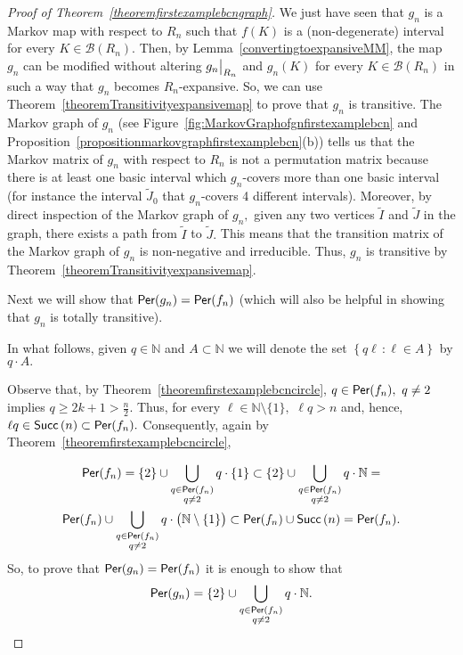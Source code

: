 \documentclass[a4paper, 11pt]{amsart}
\numberwithin{equation}{section}
\theoremstyle{customnumberedtheorem}
\theoremstyle{definitionwithbfnote}
\newcommand{\N}{\ensuremath{\mathbb{N}}}
\DeclareMathOperator{\Per}{\textsf{\upshape Per}}
\DeclareMathOperator{\Succ}{\textsf{\upshape Succ}}
\newcommand{\succs}[1]{\ensuremath{\Succ\left(#1\right)}}
\newcommand{\set}[2]{\ensuremath{\left\{#1 \,\colon #2\right\}}}
\def\calB{\mathcal{B}}
\newcommand{\SBI}[1][Q]{\ensuremath{\calB(#1)}}
\newcommand{\evalat}[1]{\bigr\rvert\sb{#1}}
\begin{document}
\begin{proof}[Proof of Theorem~\ref{theoremfirstexamplebcngraph}]
We just have seen that $g_n$ is a Markov map with respect to $R_n$
such that $f(K)$ is a (non-degenerate) interval for every
$K \in \SBI[R_n].$
Then, by Lemma~\ref{convertingtoexpansiveMM},
the map $g_n$ can be modified
without altering $g_n\evalat{R_n}$ and $g_n(K)$
for every $K \in \SBI[R_n]$ in such a way that
$g_n$ becomes $R_n$-expansive. So, we can use
Theorem~\ref{theoremTransitivityexpansivemap}
to prove that $g_n$ is transitive.
The Markov graph of $g_n$
(see Figure~\ref{fig:MarkovGraphofgnfirstexamplebcn} and
Proposition~\ref{propositionmarkovgraphfirstexamplebcn}(b))
tells us that the Markov matrix of $g_n$
with respect to $R_n$ is not a permutation matrix because there is
at least one basic interval which $g_n$-covers more than one basic interval
(for instance the interval $\widetilde{J}_0$ that $g_n$-covers 4
different intervals).
Moreover, by direct inspection of the Markov graph of $g_n,$
given any two vertices $\widetilde{I}$ and $\widetilde{J}$
in the graph, there exists a path from
$\widetilde{I}$ to $\widetilde{J}.$
This means that the transition matrix of the
Markov graph of $g_n$ is non-negative and irreducible.
Thus, $g_n$ is transitive by
Theorem~\ref{theoremTransitivityexpansivemap}.

Next we will show that $\Per(g_n) = \Per(f_n)$
(which will also be helpful in showing that $g_n$
is totally transitive).

In what follows, given $q\in \N$ and $A\subset \N$ we will
denote the set $\set{q\ell}{\ell \in A}$ by $q\cdot A.$

Observe that, by Theorem~\ref{theoremfirstexamplebcncircle},
$q\in\Per(f_n),\ q \ne 2$ implies $q \ge 2k+1 > \tfrac{n}{2}.$
Thus, for every $\ell \in \N\setminus\{1\},$
$\ell q > n$ and, hence, $\ell q \in \succs{n} \subset \Per(f_n).$
Consequently, again by Theorem~\ref{theoremfirstexamplebcncircle},

\begin{multline*}
\Per(f_n) = \{2\} \cup \bigcup_{\substack{q\in\Per(f_n)\\ q \ne 2}} q\cdot\{1\}
          \subset \{2\} \cup \bigcup_{\substack{q\in\Per(f_n)\\ q \ne 2}} q\cdot\N = \\
          \Per(f_n) \cup \bigcup_{\substack{q\in\Per(f_n)\\ q \ne 2}} q\cdot\bigl(\N\setminus\{1\}\bigr) \subset \Per(f_n) \cup \succs{n} = \Per(f_n).
\end{multline*}
So, to prove that $\Per(g_n) = \Per(f_n)$ it is enough to show that
\[
 \Per(g_n) = \{2\} \cup \bigcup_{\substack{q\in\Per(f_n)\\ q \ne 2}} q\cdot\N.
\]


\end{proof}
\end{document}

